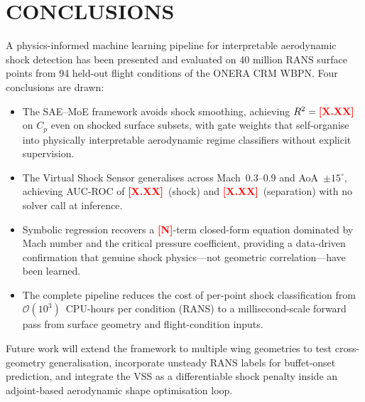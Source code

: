\documentclass{WCCM-ECCOMAS_2026_Full_Paper}
\newcommand{\result}[1]{\textcolor{red}{\textbf{[#1]}}}
\begin{document}
\section{CONCLUSIONS}

A physics-informed machine learning pipeline for interpretable
aerodynamic shock detection has been presented and evaluated on 40
million RANS surface points from 94 held-out flight conditions of the
ONERA CRM WBPN.  Four conclusions are drawn:

\begin{itemize}
  \item The SAE--MoE framework avoids shock smoothing, achieving
        $R^{2}=\result{X.XX}$ on $C_{p}$ even on shocked surface
        subsets, with gate weights that self-organise into physically
        interpretable aerodynamic regime classifiers without explicit
        supervision.
  \item The Virtual Shock Sensor generalises across Mach~$0.3$--$0.9$
        and AoA~$\pm 15^{\circ}$, achieving AUC-ROC of
        \result{X.XX}~(shock) and \result{X.XX}~(separation) with no
        solver call at inference.
  \item Symbolic regression recovers a \result{N}-term closed-form
        equation dominated by Mach number and the critical pressure
        coefficient, providing a data-driven confirmation that genuine
        shock physics---not geometric correlation---have been learned.
  \item The complete pipeline reduces the cost of per-point shock
        classification from $\mathcal{O}(10^{3})$~CPU-hours per
        condition (RANS) to a millisecond-scale forward pass from
        surface geometry and flight-condition inputs.
\end{itemize}

Future work will extend the framework to multiple wing geometries to
test cross-geometry generalisation, incorporate unsteady RANS labels
for buffet-onset prediction, and integrate the VSS as a differentiable
shock penalty inside an adjoint-based aerodynamic shape optimisation
loop.

\end{document}
